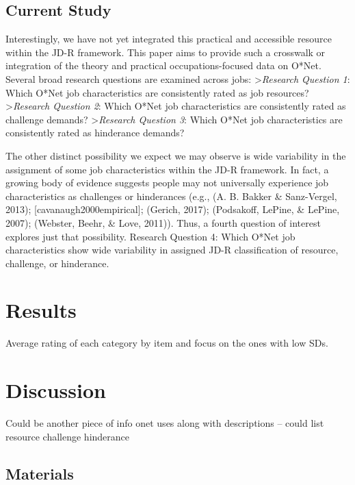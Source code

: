 \documentclass[
  english,
  man]{apa6}
\begin{document}
\hypertarget{current-study}{%
\subsection{Current Study}\label{current-study}}

Interestingly, we have not yet integrated this practical and accessible resource within the JD-R framework. This paper aims to provide such a crosswalk or integration of the theory and practical occupations-focused data on O*Net. Several broad research questions are examined across jobs:
\textgreater{}\emph{Research Question 1}: Which O*Net job characteristics are consistently rated as job resources?
\textgreater{}\emph{Research Question 2}: Which O*Net job characteristics are consistently rated as challenge demands?
\textgreater{}\emph{Research Question 3}: Which O*Net job characteristics are consistently rated as hinderance demands?

The other distinct possibility we expect we may observe is wide variability in the assignment of some job characteristics within the JD-R framework. In fact, a growing body of evidence suggests people may not universally experience job characteristics as challenges or hinderances (e.g., (A. B. Bakker \& Sanz-Vergel, 2013); {[}cavanaugh2000empirical{]}; (Gerich, 2017); (Podsakoff, LePine, \& LePine, 2007); (Webster, Beehr, \& Love, 2011)). Thus, a fourth question of interest explores just that possibility.
Research Question 4: Which O*Net job characteristics show wide variability in assigned JD-R classification of resource, challenge, or hinderance.

\hypertarget{results}{%
\section{Results}\label{results}}

Average rating of each category by item and focus on the ones with low SDs.

\hypertarget{discussion}{%
\section{Discussion}\label{discussion}}

Could be another piece of info onet uses along with descriptions -- could list resource challenge hinderance

\hypertarget{materials}{%
\subsection{Materials}\label{materials}}
\end{document}
